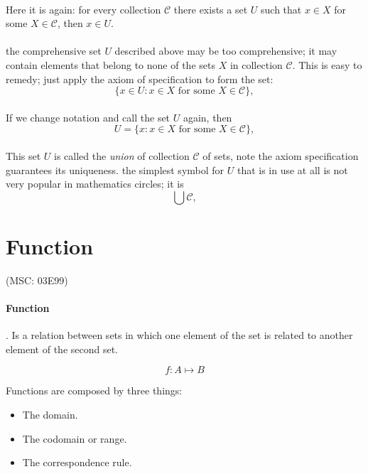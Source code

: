 \documentclass{article}
\begin{document}
\paragraph{} Here it is again: for every collection $\mathscr{C}$ there exists a set $U$ such that $x \in X$ for some $X \in \mathscr{C}$, then $x \in U$.
\paragraph{}the comprehensive set $U$ described above may be too comprehensive; it may contain elements that belong to none of the sets $X$ in collection $\mathscr{C}$. This is easy to remedy; just apply the axiom of specification to form the set:
$$\{x \in U: x \in X \text{ for some } X \in \mathscr{C}\},$$
\paragraph{}If we change notation and call the set $U$ again, then
$$U = \{x: x \in X \text{ for some } X \in \mathscr{C}\},$$
\paragraph{}This set $U$ is called 	the \textit{union} of collection $\mathscr{C}$ of sets, note the axiom specification guarantees its uniqueness. the simplest symbol for $U$ that is in use at all is not very popular in mathematics circles; it is
$$\bigcup \mathscr{C},$$
\paragraph{}
\section{Function}
(MSC: 03E99)
\paragraph{Function} . Is a relation between sets in which one element of the set is related to another element of the second set.

$$f: A \mapsto B$$

Functions are composed by three things:

\begin{itemize}
    \item The domain.
    \item The codomain or range.
    \item The correspondence rule.
\end{itemize}
\end{document}
